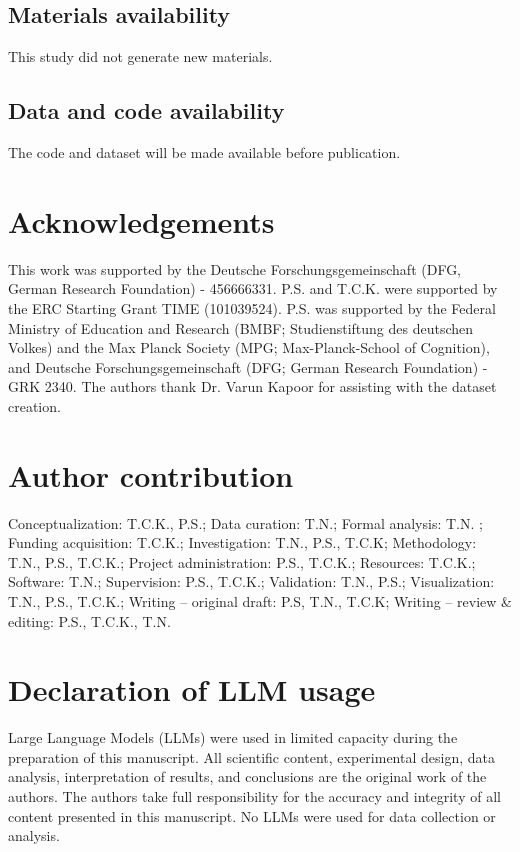 \documentclass[10pt,letterpaper]{article}
\begin{document}
\subsection{Materials availability}

This study did not generate new materials.

\subsection{Data and code availability} %

The code and dataset will be made available before publication.

\section{Acknowledgements}

This work was supported by the Deutsche Forschungsgemeinschaft (DFG, German Research Foundation) - 456666331. P.S. and T.C.K. were supported by the ERC Starting Grant TIME (101039524). P.S. was supported by the Federal Ministry of Education and Research (BMBF; Studienstiftung des deutschen Volkes) and the Max Planck Society (MPG; Max-Planck-School of Cognition), and Deutsche Forschungsgemeinschaft (DFG; German Research Foundation) - GRK 2340. The authors thank Dr. Varun Kapoor for assisting with the dataset creation.

\section{Author contribution}

Conceptualization: T.C.K., P.S.; Data curation: T.N.; Formal analysis: T.N. ; Funding acquisition: T.C.K.; Investigation: T.N., P.S., T.C.K; Methodology: T.N., P.S., T.C.K.; Project administration: P.S., T.C.K.; Resources: T.C.K.; Software: T.N.; Supervision: P.S., T.C.K.; Validation: T.N., P.S.; Visualization: T.N., P.S., T.C.K.; Writing – original draft: P.S, T.N., T.C.K; Writing – review \& editing: P.S., T.C.K., T.N.

\section{Declaration of LLM usage}

Large Language Models (LLMs) were used in limited capacity during the preparation of this manuscript. All scientific content, experimental design, data analysis, interpretation of results, and conclusions are the original work of the authors. The authors take full responsibility for the accuracy and integrity of all content presented in this manuscript. No LLMs were used for data collection or analysis.
\end{document}

